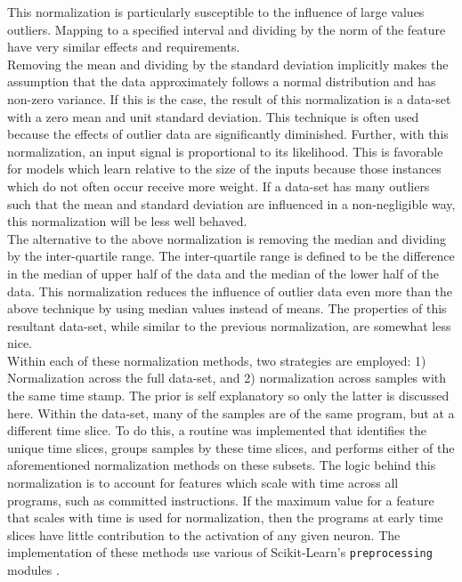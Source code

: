 \documentclass[paper=a4, fontsize=11pt]{scrartcl} %
\begin{document}
This normalization is particularly susceptible to the influence of large values outliers.
Mapping to a specified interval and dividing by the norm of the feature have very similar effects and requirements.
\\
Removing the mean and dividing by the standard deviation implicitly makes the assumption that the data approximately follows a normal distribution and has non-zero variance.
If this is the case, the result of this normalization is a data-set with a zero mean and unit standard deviation.
This technique is often used because the effects of outlier data are significantly diminished.
Further, with this normalization, an input signal is proportional to its likelihood.
This is favorable for models which learn relative to the size of the inputs because those instances which do not often occur receive more weight.
If a data-set has many outliers such that the mean and standard deviation are influenced in a non-negligible way, this normalization will be less well behaved.
\\
The alternative to the above normalization is removing the median and dividing by the inter-quartile range.
The inter-quartile range is defined to be the difference in the median of upper half of the data and the median of the lower half of the data.
This normalization reduces the influence of outlier data even more than the above technique by using median values instead of means.
The properties of this resultant data-set, while similar to the previous normalization, are somewhat less nice.
\\
Within each of these normalization methods, two strategies are employed: 1) Normalization across the full data-set, and 2) normalization across samples with the same time stamp.
The prior is self explanatory so only the latter is discussed here.
Within the data-set, many of the samples are of the same program, but at a different time slice.
To do this, a routine was implemented that identifies the unique time slices, groups samples by these time slices, and performs either of the aforementioned normalization methods on these subsets.
The logic behind this normalization is to account for features which scale with time across all programs, such as committed instructions.
If the maximum value for a feature that scales with time is used for normalization, then the programs at early time slices have little contribution to the activation of any given neuron.
The implementation of these methods use various of Scikit-Learn's \verb|preprocessing| modules \cite{scikit-learn}.
\\
\end{document}
